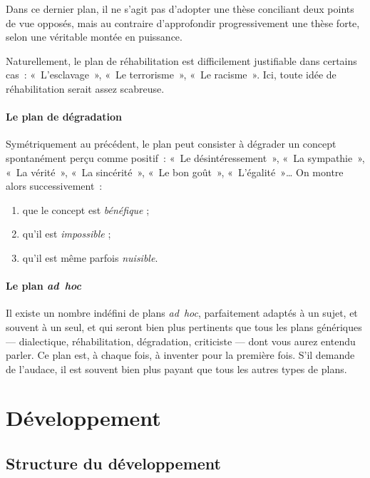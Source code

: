 \documentclass[a4paper]{article}
\begin{document}
Dans ce dernier plan, il ne s'agit pas d'adopter une thèse conciliant
deux points de vue opposés, mais au contraire d'approfondir
progressivement une thèse forte, selon une véritable montée en
puissance.

Naturellement, le plan de réhabilitation est difficilement justifiable
dans certains cas : « L'esclavage », « Le terrorisme », « Le racisme ». Ici,
toute idée de réhabilitation serait assez scabreuse.

\paragraph{Le plan de dégradation}
\label{sec-2-4-2-4}

Symétriquement au précédent, le plan peut consister à dégrader un
concept spontanément perçu comme positif : « Le désintéressement », « La
sympathie », « La vérité », « La sincérité », « Le bon goût », « L'égalité »\ldots{}
On montre alors successivement :

\begin{enumerate}
\item que le concept est \emph{bénéfique} ;

\item qu'il est \emph{impossible} ;

\item qu'il est même parfois \emph{nuisible}.
\end{enumerate}

\paragraph{Le plan \emph{ad hoc}}
\label{sec-2-4-2-5}

Il existe un nombre indéfini de plans \emph{ad hoc}, parfaitement adaptés à
un sujet, et souvent à un seul, et qui seront bien plus pertinents que
tous les plans génériques --- dialectique, réhabilitation, dégradation,
criticiste --- dont vous aurez entendu parler. Ce plan est, à chaque
fois, à inventer pour la première fois. S'il demande de l'audace, il est
souvent bien plus payant que tous les autres types de plans.



\section{Développement}
\label{sec-3}

\subsection{Structure du développement}
\label{sec-3-1}
\end{document}
